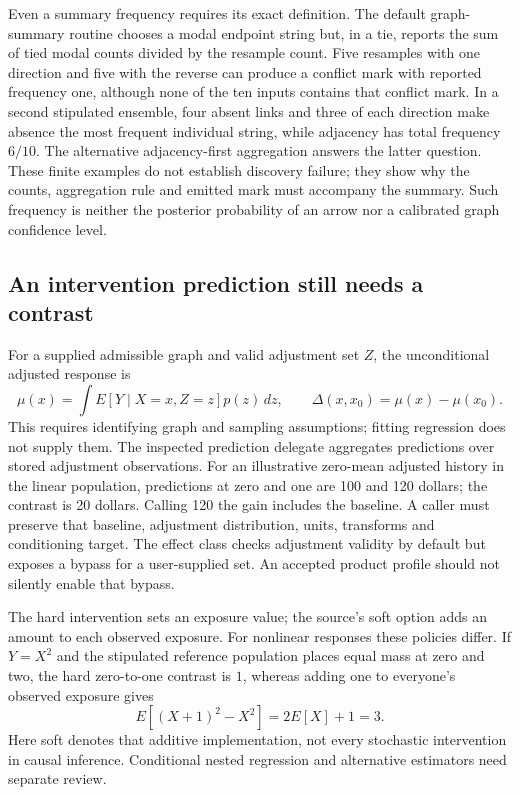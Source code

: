 Even a summary frequency requires its exact definition. The default graph-summary routine chooses a modal endpoint string but, in a tie, reports the sum of tied modal counts divided by the resample count. Five resamples with one direction and five with the reverse can produce a conflict mark with reported frequency one, although none of the ten inputs contains that conflict mark. In a second stipulated ensemble, four absent links and three of each direction make absence the most frequent individual string, while adjacency has total frequency $6/10$. The alternative adjacency-first aggregation answers the latter question. These finite examples do not establish discovery failure; they show why the counts, aggregation rule and emitted mark must accompany the summary. Such frequency is neither the posterior probability of an arrow nor a calibrated graph confidence level. \cite{exec23_tigramite_reuse_source,exec23_tigramite_reference}

\subsection{An intervention prediction still needs a contrast}
\label{exec23:tigramite-intervention}
For a supplied admissible graph and valid adjustment set $Z$, the unconditional adjusted response is
\begin{equation}
 \mu(x)=\int E[Y\mid X=x,Z=z]p(z)\,dz,\qquad
 \Delta(x,x_0)=\mu(x)-\mu(x_0).
 \label{exec23:tigramite-contrast}
\end{equation}
This requires identifying graph and sampling assumptions; fitting regression does not supply them. The inspected prediction delegate aggregates predictions over stored adjustment observations. For an illustrative zero-mean adjusted history in the linear population, predictions at zero and one are 100 and 120 dollars; the contrast is 20 dollars. Calling 120 the gain includes the baseline. A caller must preserve that baseline, adjustment distribution, units, transforms and conditioning target. The effect class checks adjustment validity by default but exposes a bypass for a user-supplied set. An accepted product profile should not silently enable that bypass. \cite{exec23_tigramite_reuse_source,exec23_tigramite_reference}

The hard intervention sets an exposure value; the source's soft option adds an amount to each observed exposure. For nonlinear responses these policies differ. If $Y=X^2$ and the stipulated reference population places equal mass at zero and two, the hard zero-to-one contrast is $1$, whereas adding one to everyone's observed exposure gives
\begin{equation}
 E[(X+1)^2-X^2]=2E[X]+1=3.
 \label{exec23:tigramite-policy}
\end{equation}
Here soft denotes that additive implementation, not every stochastic intervention in causal inference. Conditional nested regression and alternative estimators need separate review. \cite{exec23_tigramite_reuse_source,exec23_tigramite_reference}

